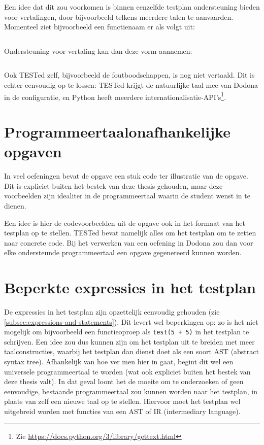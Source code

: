 Een idee dat dit zou voorkomen is binnen eenzelfde testplan ondersteuning bieden voor vertalingen, door bijvoorbeeld telkens meerdere talen te aanvaarden.
Momenteel ziet bijvoorbeeld een functienaam er als volgt uit:

\inputminted{json}{code/example-name.json}

Ondersteuning voor vertaling kan dan deze vorm aannemen:

\inputminted{json}{code/example-name-trans.json}

Ook TESTed zelf, bijvoorbeeld de foutboodschappen, is nog niet vertaald.
Dit is echter eenvoudig op te lossen: TESTed krijgt de natuurlijke taal mee van Dodona in de configuratie, en Python heeft meerdere internationalisatie-API's\footnote{Zie \url{https://docs.python.org/3/library/gettext.html}}.

\section{Programmeertaalonafhankelijke opgaven}\label{sec:programmeertaalonafhankelijke-opgaven}

In veel oefeningen bevat de opgave een stuk code ter illustratie van de opgave.
Dit is expliciet buiten het bestek van deze thesis gehouden, maar deze voorbeelden zijn idealiter in de programmeertaal waarin de student wenst in te dienen.

Een idee is hier de codevoorbeelden uit de opgave ook in het formaat van het testplan op te stellen.
TESTed bevat namelijk alles om het testplan om te zetten naar concrete code.
Bij het verwerken van een oefening in Dodona zou dan voor elke ondersteunde programmeertaal een opgave gegenereerd kunnen worden.

\section{Beperkte expressies in het testplan}\label{sec:beperkte-expressies-in-het-testplan}

De expressies in het testplan zijn opzettelijk eenvoudig gehouden (zie \cref{subsec:expressions-and-statements}).
Dit levert wel beperkingen op: zo is het niet mogelijk om bijvoorbeeld een functieoproep als \texttt{test(5 + 5)} in het testplan te schrijven.
Een idee zou dus kunnen zijn om het testplan uit te breiden met meer taalconstructies, waarbij het testplan dan dienst doet als een soort AST (abstract syntax tree).
Afhankelijk van hoe ver men hier in gaat, begint dit wel een universele programmeertaal te worden (wat ook expliciet buiten het bestek van deze thesis valt).
In dat geval loont het de moeite om te onderzoeken of geen eenvoudige, bestaande programmeertaal  zou kunnen worden naar het testplan, in plaats van zelf een nieuwe taal op te stellen.
Hiervoor moet het testplan wel uitgebreid worden met functies van een AST of IR (intermediary language).



